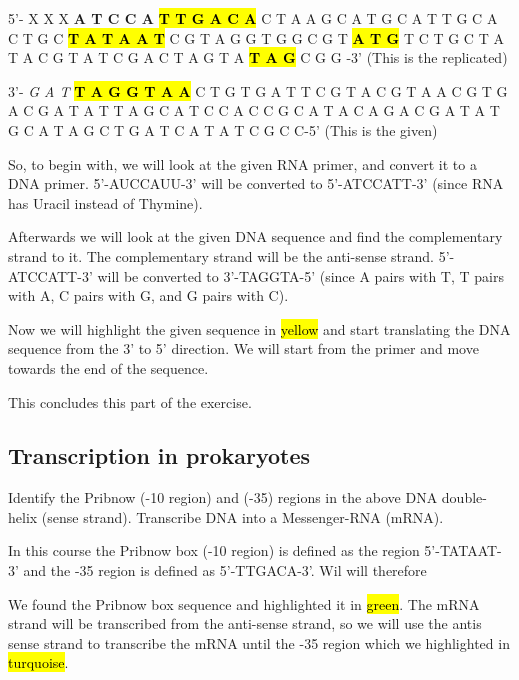 \vspace{1em}

5'- X X X \textbf{A T C C A} \textbf{\hl{T T G A C A}} C T A A G C A T G C A T T G C A C T G C \hl{\textbf{T A T A A T}} C G T A G G T G G C G T \textbf{\hl{A T G}} T C T G C T A T A C G T A T C G A C T A G T A \textbf{\hl{T A G}} C G G -3'      (This is the replicated)

\vspace{1em}

3’- \textit{G A T} \hl{\textbf{T A G G T A A}} C T G T G A T T C G T A C G T A A C G T G A C G A T A T T A G C A T C C A C C G C A T A C A G A C G A T A T G C A T A G C T G A T C A T A T C G C C-5’      (This is the given)

\vspace{1em}

So, to begin with, we will look at the given RNA primer, and convert it to a DNA primer.
5'-AUCCAUU-3' will be converted to 5'-ATCCATT-3' (since RNA has Uracil instead of Thymine). 


Afterwards we will look at the given DNA sequence and find the complementary strand to it. The complementary strand will be the anti-sense strand. 5'-ATCCATT-3' will be converted to 3'-TAGGTA-5' (since A pairs with T, T pairs with A, C pairs with G, and G pairs with C).


Now we will highlight the given sequence in \hl{yellow} and start translating the DNA sequence from the 3' to 5' direction. We will start from the primer and move towards the end of the sequence.

\vspace{1em}
This concludes this part of the exercise.

\subsection{Transcription in prokaryotes}
Identify the Pribnow (-10 region) and (-35) regions in the above DNA double-helix (sense strand). Transcribe DNA into a Messenger-RNA (mRNA).

\vspace{1em}
In this course the Pribnow box (-10 region) is defined as the region 5’-TATAAT-3’ and the -35 region is defined as 5’-TTGACA-3’. Wil will therefore 

We found the Pribnow box sequence and highlighted it in \hl{green}. The mRNA strand will be transcribed from the anti-sense strand, so we will use the antis sense strand to transcribe the mRNA until the -35 region which we highlighted in \hl{turquoise}.


